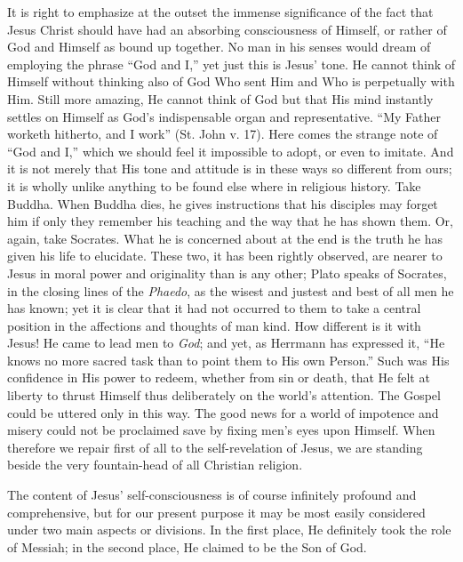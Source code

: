 \documentclass[12pt,a5paper,oneside]{book}
\begin{document}
It is right to emphasize at the outset the
immense significance of the fact that Jesus
Christ should have had an absorbing consciousness 
of Himself, or rather of God and Himself
as bound up together. No man in his senses
would dream of employing the phrase ``God and
I,'' yet just this is Jesus' tone. He cannot
think of Himself without thinking also of God
Who sent Him and Who is perpetually with
Him. Still more amazing, He cannot think of
God but that His mind instantly settles on
Himself as God's indispensable organ and
representative. ``My Father worketh hitherto,
and I work'' (St. John v. 17). Here comes the
strange note of ``God and I,'' which we should
feel it impossible to adopt, or even to imitate.
And it is not merely that His tone and
attitude is in these ways so different from ours;
it is wholly unlike anything to be found else
where in religious history. Take Buddha.
When Buddha dies, he gives instructions that
his disciples may forget him if only they remember 
his teaching and the way that he has shown
them. Or, again, take Socrates. What he is
concerned about at the end is the truth he has
given his life to elucidate. These two, it has
been rightly observed, are nearer to Jesus in
moral power and originality than is any other;
Plato speaks of Socrates, in the closing lines of
the \textit{Phaedo}, as the wisest and justest and best
of all men he has known; yet it is clear that it
had not occurred to them to take a central
position in the affections and thoughts of man
kind. How different is it with Jesus! He
came to lead men to \textit{God}; and yet, as
Herrmann has expressed it, ``He knows no
more sacred task than to point them to His
own Person.'' Such was His confidence in His
power to redeem, whether from sin or death,
that He felt at liberty to thrust Himself thus
deliberately on the world's attention. The
Gospel could be uttered only in this way. The
good news for a world of impotence and misery
could not be proclaimed save by fixing men's
eyes upon Himself. When therefore we repair
first of all to the self-revelation of Jesus, we are
standing beside the very fountain-head of all
Christian religion.

The content of Jesus' self-consciousness is
of course infinitely profound and comprehensive,
but for our present purpose it may be most
easily considered under two main aspects or
divisions. In the first place, He definitely took
the role of Messiah; in the second place, He
claimed to be the Son of God.
\end{document}
